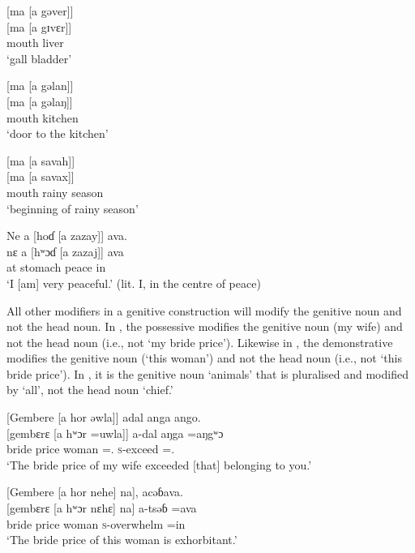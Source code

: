 \ea \label{ex:5:78}
{}[ma  [a  gəver]]\\
\gll  {}[ma   [a  gɪvɛr]]\\
      mouth  {\GEN}  liver\\
\glt  ‘gall bladder’
\z

\ea \label{ex:5:79}
{}[ma  [a  gəlan]]\\
\gll  {}[ma   [a  gəlaŋ]]\\
      mouth  {\GEN}  kitchen\\
\glt  ‘door to the kitchen’
\z

\ea \label{ex:5:80}
{}[ma  [a  savah]]\\
\gll  {}[ma   [a  savax]]\\
      mouth  {\GEN}  {rainy season}\\
\glt  ‘beginning of rainy season’
\z

\ea \label{ex:5:81}
Ne  a  [hoɗ  [a  zazay]]  ava.\\
\gll  nɛ  a   [hʷɔɗ  [a   zazaj]]   ava\\
      {\oneS}  at  stomach  {\GEN}  peace  in\\
\glt  ‘I [am] very peaceful.’ (lit. I, in the centre of peace)
\z

All other modifiers in a genitive construction will modify the genitive noun and not the head noun. In , the possessive modifies the genitive noun (my wife) and not the head noun (i.e., not ‘my bride price’). Likewise in , the demonstrative modifies the genitive noun (‘this woman’) and not the head noun (i.e., not ‘this bride price’). In , it is the genitive noun ‘animals’ that is pluralised and modified by ‘all’, not the head noun ‘chief.’

\ea \label{ex:5:82}
{}[Gembere  [a  hor  əwla]]  adal  anga  ango.\\
\gll  {}[gembɛrɛ  [a  hʷɔr  =uwla]]    a-dal    aŋga  =aŋgʷɔ\\
      {bride price}  {\GEN}  woman  ={\oneS}.{\POSS}  \textsc{s}-exceed  {\POSS}  ={\twoS}.{\POSS}\\
\glt  ‘The bride price of my wife exceeded [that] belonging to you.’
\z

\ea \label{ex:5:83}
{}[Gembere  [a  hor  nehe]  na],  acəɓava.\\
\gll  {}[gembɛrɛ  [a  hʷɔr  nɛhɛ]  na]  a-tsəɓ =ava\\
      {bride price}  {\GEN}  woman  {\DEM}  {\PSP}  \textsc{s}-overwhelm  =in\\
\glt  ‘The bride price of this woman is exhorbitant.’ 
\z

